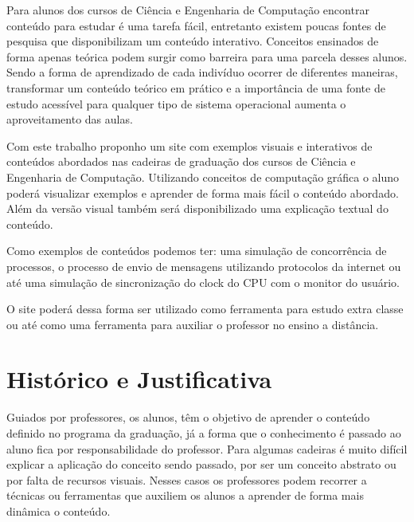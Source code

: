 \documentclass[tcc-proposta]{texufpel}
\begin{document}
Para alunos dos cursos de Ciência e Engenharia de Computação encontrar conteúdo para estudar é uma tarefa fácil, entretanto existem poucas fontes de pesquisa que disponibilizam um conteúdo interativo. Conceitos ensinados de forma apenas teórica podem surgir como barreira para uma parcela desses alunos. Sendo a forma de aprendizado de cada indivíduo ocorrer de diferentes maneiras, transformar um conteúdo teórico em prático e a importância de uma fonte de estudo acessível para qualquer tipo de sistema operacional aumenta o aproveitamento das aulas.

Com este trabalho proponho um site com exemplos visuais e interativos de conteúdos abordados nas cadeiras de graduação dos cursos de Ciência e Engenharia de Computação. Utilizando conceitos de computação gráfica o aluno poderá visualizar exemplos e aprender de forma mais fácil o conteúdo abordado. Além da versão visual também será disponibilizado uma explicação textual do conteúdo.

Como exemplos de conteúdos podemos ter: uma simulação de concorrência de processos, o processo de envio de mensagens utilizando protocolos da internet ou até uma simulação de sincronização do clock do CPU com o monitor do usuário.

O site poderá dessa forma ser utilizado como ferramenta para estudo extra classe ou até como uma ferramenta para auxiliar o professor no ensino a distância.

\chapter{Histórico e Justificativa}


Guiados por professores, os alunos, têm o objetivo de aprender o conteúdo definido no programa da graduação, já a forma que o conhecimento é passado ao aluno fica por responsabilidade do professor. Para algumas cadeiras é muito difícil explicar a aplicação do conceito sendo passado, por ser um conceito abstrato ou por falta de recursos visuais. Nesses casos os professores podem recorrer a técnicas ou ferramentas que auxiliem os alunos a aprender de forma mais dinâmica o conteúdo.
\end{document}
